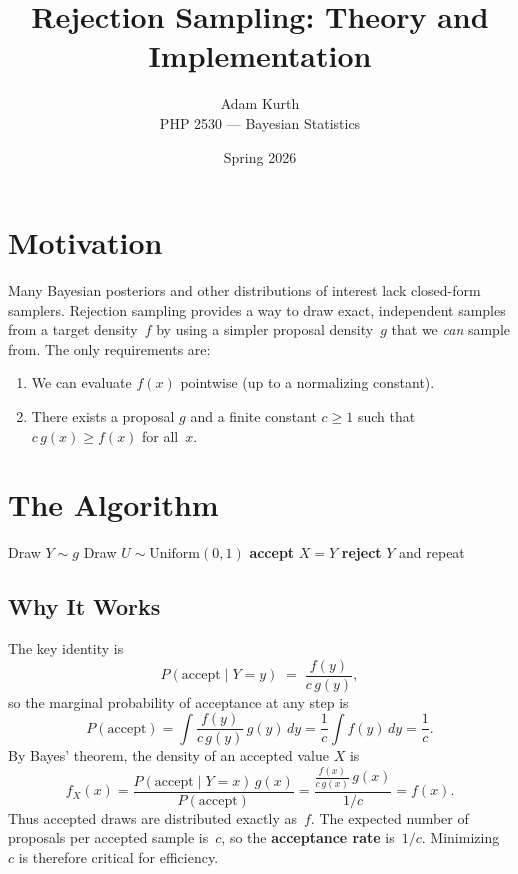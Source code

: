\documentclass[11pt]{article}
\title{Rejection Sampling: Theory and Implementation}
\author{Adam Kurth \\ PHP 2530 --- Bayesian Statistics}
\date{Spring 2026}
\begin{document}
\maketitle

\section{Motivation}

Many Bayesian posteriors and other distributions of interest lack closed-form samplers.  Rejection sampling provides a way to draw exact, independent samples from a target density~$f$ by using a simpler proposal density~$g$ that we \emph{can} sample from.  The only requirements are:
\begin{enumerate}
  \item We can evaluate $f(x)$ pointwise (up to a normalizing constant).
  \item There exists a proposal $g$ and a finite constant $c \ge 1$ such that $c\,g(x) \ge f(x)$ for all~$x$.
\end{enumerate}

\section{The Algorithm}

\begin{algorithm}[H]
\caption{Rejection Sampling}
\label{alg:reject}
\begin{algorithmic}[1]
\Repeat
  \State Draw $Y \sim g$ 
  \State Draw $U \sim \mathrm{Uniform}(0,1)$ 
   
    \State \textbf{accept} $X = Y$
  \Else
    \State \textbf{reject} $Y$ and repeat
  \EndIf
{}
\end{algorithmic}
\end{algorithm}

\subsection{Why It Works}

The key identity is
\[
  P(\text{accept} \mid Y = y) \;=\; \frac{f(y)}{c\,g(y)},
\]
so the marginal probability of acceptance at any step is
\[
  P(\text{accept})
  = \int \frac{f(y)}{c\,g(y)}\,g(y)\,dy
  = \frac{1}{c}\int f(y)\,dy
  = \frac{1}{c}.
\]
By Bayes' theorem, the density of an accepted value $X$ is
\[
  f_{X}(x)
  = \frac{P(\text{accept}\mid Y=x)\,g(x)}{P(\text{accept})}
  = \frac{\tfrac{f(x)}{c\,g(x)}\,g(x)}{1/c}
  = f(x).
\]
Thus accepted draws are distributed exactly as~$f$.  The expected number of proposals per accepted sample is~$c$, so the \textbf{acceptance rate} is~$1/c$.  Minimizing~$c$ is therefore critical for efficiency.
\end{document}
